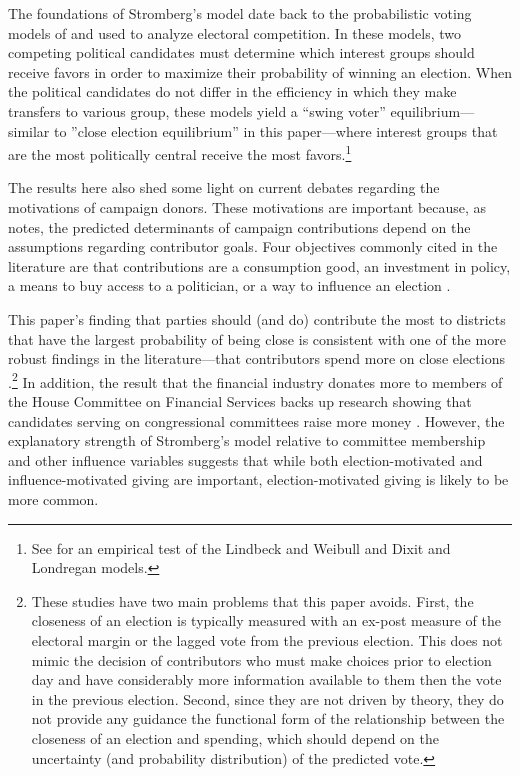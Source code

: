 \documentclass[12pt,final,fleqn]{article}
\theoremstyle{plain}
\begin{document}
The foundations of Stromberg's model date back to the probabilistic voting models of \citet{lindbeck1987balanced} and \citet{dixit1996determinants} used to analyze electoral competition. In these models, two competing political candidates must determine which interest groups should receive favors in order to maximize their probability of winning an election. When the political candidates do not differ in the efficiency in which they make transfers to various group, these models yield a ``swing voter'' equilibrium---similar to ''close election equilibrium'' in this paper---where interest groups that are the most politically central receive the most favors.\footnote{See \citet{johansson2003intergovernmental} for an empirical test of the Lindbeck and Weibull and Dixit and Londregan models.}

The results here also shed some light on current debates regarding the motivations of campaign donors. These motivations are important because, as \citet{stratmann2005some} notes, the predicted determinants of campaign contributions depend on the assumptions regarding contributor goals. Four objectives commonly cited in the literature are that contributions are a consumption good, an investment in policy, a means to buy access to a politician, or a way to influence an election \citep[e.g.][]{ansolabehere2003there, stratmann2005some}. 

This paper's finding that parties should (and do) contribute the most to districts that have the largest probability of being close is consistent with one of the more robust findings in the literature---that contributors spend more on close elections \citep{kau1982general, jacobson1985money, poole1985patterns, stratmann1991campaign}.\footnote{These studies have two main problems that this paper avoids. First, the closeness of an election is typically measured with an ex-post measure of the electoral margin or the lagged vote from the previous election. This does not mimic the decision of contributors who must make choices prior to election day and have considerably more information available to them then the vote in the previous election. Second, since they are not driven by theory, they do not provide any guidance the functional form of the relationship between the closeness of an election and spending, which should depend on the uncertainty (and probability distribution) of the predicted vote.} In addition, the result that the financial industry donates more to members of the House Committee on Financial Services backs up research showing that candidates serving on congressional committees raise more money \citep{grier1991committee, romer1994empirical, kroszner1998interest}. However, the explanatory strength of Stromberg's model relative to committee membership and other influence variables suggests that while both election-motivated and influence-motivated giving are important, election-motivated giving is likely to be more common.  
\end{document}

